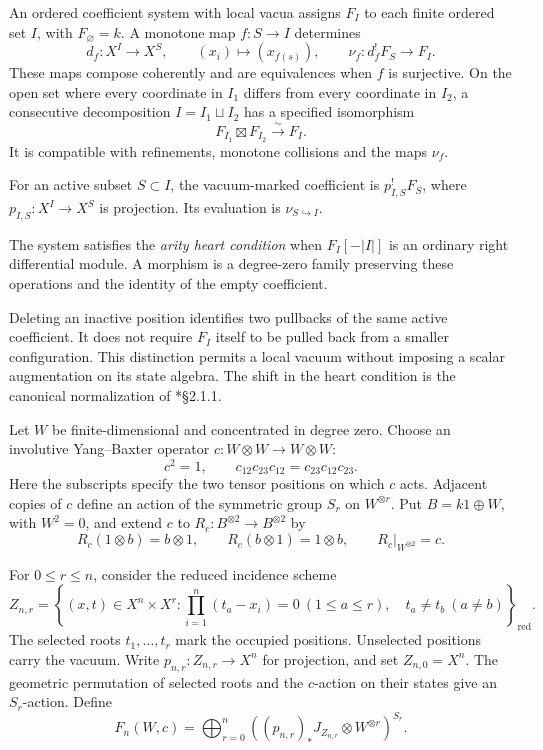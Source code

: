 \begin{definition}\label{cycmp:def:vacua}
An ordered coefficient system with local vacua assigns $F_I$ to each
finite ordered set $I$, with $F_\varnothing=k$. A monotone map
$f:S\to I$ determines
\[
 d_f:X^I\longrightarrow X^S,
 \qquad (x_i)\longmapsto(x_{f(s)}),
 \qquad \nu_f:d_f^!F_S\longrightarrow F_I.
\]
These maps compose coherently and are equivalences when $f$ is
surjective. On the open set where every coordinate in $I_1$ differs
from every coordinate in $I_2$, a consecutive decomposition
$I=I_1\sqcup I_2$ has a specified isomorphism
\[
 F_{I_1}\boxtimes F_{I_2}\xrightarrow{\sim}F_I.
\]
It is compatible with refinements, monotone collisions and the maps
$\nu_f$.

For an active subset $S\subset I$, the vacuum-marked
coefficient is $p_{I,S}^!F_S$, where $p_{I,S}:X^I\to X^S$ is
projection. Its evaluation is $\nu_{S\hookrightarrow I}$.

The system satisfies the \emph{arity heart condition} when
$F_I[-|I|]$ is an ordinary right differential module. A morphism is a
degree-zero family preserving these operations and the identity of
the empty coefficient.
\end{definition}

Deleting an inactive position identifies two pullbacks of the same
active coefficient. It does not require $F_I$ itself to be pulled
back from a smaller configuration. This distinction permits a local
vacuum without imposing a scalar augmentation on its state algebra.
The shift in the heart condition is the canonical normalization of
\cite{BD04}*{\S2.1.1}.

Let $W$ be finite-dimensional and concentrated in degree zero. Choose
an involutive Yang--Baxter operator $c:W\otimes W\to W\otimes W$:
\[
 c^2=1,\qquad c_{12}c_{23}c_{12}=c_{23}c_{12}c_{23}.
\]
Here the subscripts specify the two tensor positions on which $c$
acts. Adjacent copies of $c$ define an action of the symmetric group
$S_r$ on $W^{\otimes r}$. Put $B=k1\oplus W$, with $W^2=0$, and
extend $c$ to $R_c:B^{\otimes2}\to B^{\otimes2}$ by
\[
 R_c(1\otimes b)=b\otimes1,
 \qquad R_c(b\otimes1)=1\otimes b,
 \qquad R_c|_{W^{\otimes2}}=c.
\]

For $0\le r\le n$, consider the reduced incidence scheme
\begin{equation}\label{cycmp:eq:incidence}
 Z_{n,r}=\left\{(x,t)\in X^n\times X^r:
  \prod_{i=1}^n(t_a-x_i)=0\ (1\le a\le r),\quad
  t_a\ne t_b\ (a\ne b)\right\}_{\mathrm{red}}.
\end{equation}
The selected roots $t_1,\ldots,t_r$ mark the occupied positions.
Unselected positions carry the vacuum. Write $p_{n,r}:Z_{n,r}\to X^n$
for projection, and set $Z_{n,0}=X^n$. The geometric permutation of
selected roots and the $c$-action on their states give an $S_r$-action.
Define
\begin{equation}\label{cycmp:eq:particles}
 F_n(W,c)=\bigoplus_{r=0}^n
       \left((p_{n,r})_*J_{Z_{n,r}}\otimes W^{\otimes r}\right)^{S_r}.
\end{equation}

